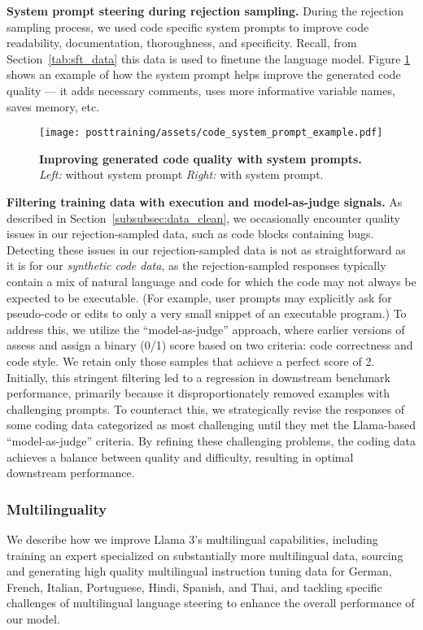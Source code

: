 \textbf{System prompt steering during rejection sampling.} 
During the rejection sampling process, we used code specific system prompts to improve 
code readability, documentation, thoroughness, and specificity. Recall, from Section~\ref{tab:sft_data} this data is used to finetune the language model.  Figure \ref{fig:code_system_prompt_example} shows an example of how the system prompt helps improve the generated code quality --- it  adds necessary comments, uses more informative variable names, saves memory, etc.

\begin{figure}
\centering
\texttt{[image: posttraining/assets/code\_system\_prompt\_example.pdf]}
\caption{\label{fig:code_system_prompt_example} \textbf{Improving generated code quality with system prompts.} \emph{Left:} without system prompt \emph{Right:} with system prompt.}
\end{figure}

\textbf{Filtering training data with execution and model-as-judge signals.} 
As described in Section~\ref{subsubsec:data_clean}, we occasionally encounter quality issues in our rejection-sampled data, such as code blocks containing bugs. Detecting these issues in our rejection-sampled data is not as straightforward as it is for our \emph{synthetic code data}, as the rejection-sampled responses typically contain a mix of natural language and code for which the code may not always be expected to be executable. (For example, user prompts may explicitly ask for pseudo-code or edits to only a very small snippet of an executable program.) To address this, we utilize the ``model-as-judge'' approach, where earlier versions of \llamathree assess and assign a binary (0/1) score based on two criteria: code correctness and code style. We retain only those samples that achieve a perfect score of 2. Initially, this stringent filtering led to a regression in downstream benchmark performance, primarily because it disproportionately removed examples with challenging prompts. To counteract this, we strategically revise the responses of some coding data categorized as most challenging until they met the Llama-based ``model-as-judge'' criteria. By refining these challenging problems, the coding data achieves a balance between quality and difficulty, resulting in optimal downstream performance.

\subsubsection{Multilinguality}
\label{subsubsec:multilingual}
We describe how we improve Llama 3's multilingual capabilities, including training an expert specialized on substantially more multilingual data, sourcing and generating high quality multilingual instruction tuning data for German, French, Italian, Portuguese, Hindi, Spanish, and Thai, and tackling specific challenges of multilingual language steering to enhance the overall performance of our model. 

